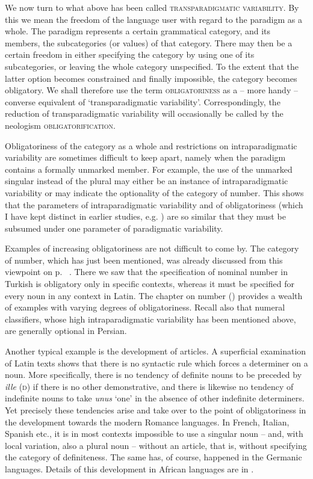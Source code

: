 We now turn to what above has been called \textsc{transparadigmatic variability}. By this we mean the freedom of the language user with regard to the paradigm as a whole. The paradigm represents a certain grammatical category, and its members, the subcategories (or values) of that category. There may then be a certain freedom in either specifying the category by using one of its subcategories, or leaving the whole category unspecified. To the extent that the latter option becomes constrained and finally impossible, the category becomes obligatory. We shall therefore use the term \textsc{obligatoriness} as a -- more handy -- converse equivalent of ‘transparadigmatic variability’. Correspondingly, the reduction of transparadigmatic variability will occasionally be called by the neologism \textsc{obligatorification}.

Obligatoriness of the category as a whole and restrictions on intraparadigmatic variability are sometimes difficult to keep apart, namely when the paradigm contains a formally unmarked member. For example, the use of the unmarked singular instead of the plural may either be an instance of intraparadigmatic variability or may indicate the optionality of the category of number. This shows that the parameters of intraparadigmatic variability and of obligatoriness (which I have kept distinct in earlier studies, e.g. \citealt[234ff]{Lehmann1982b}) are so similar that they must be subsumed under one parameter of paradigmatic variability.

Examples of increasing obligatoriness are not difficult to come by. The category of number, which has just been mentioned, was already discussed from this viewpoint on p.~\pageref{page14}\chk%
. There we saw that the specification of nominal number in Turkish is obligatory only in specific contexts, whereas it must be specified for every noun in any context in Latin. The chapter on number () provides a wealth of examples with varying degrees of obligatoriness. Recall also that numeral classifiers, whose high intraparadigmatic variability has been mentioned above, are generally optional in Persian.

Another typical example is the development of articles. A superficial examination of Latin texts shows that there is no syntactic rule which forces a determiner on a noun. More specifically, there is no tendency of definite nouns to be preceded by \textit{ille} (\textsc{d}) if there is no other demonstrative, and there is likewise no tendency of indefinite nouns to take \textit{unus} ‘one’ in the absence of other indefinite determiners. Yet precisely these tendencies arise and take over to the point of obligatoriness in the development towards the modern Romance languages. In French, Italian, Spanish etc., it is in most contexts impossible to use a singular noun -- and, with local variation, also a plural noun -- without an article, that is, without specifying the category of definiteness. The same has, of course, happened in the Germanic languages. Details of this development in African languages are in \citet[§3.3.--3.5]{Greenberg1978}.

